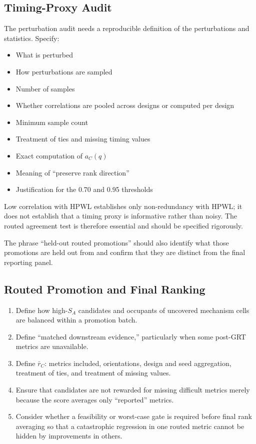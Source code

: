 \documentclass[11pt]{article}
\begin{document}
\subsection{Timing-Proxy Audit}

The perturbation audit needs a reproducible definition of the perturbations
and statistics. Specify:

\begin{itemize}
  \item What is perturbed
  \item How perturbations are sampled
  \item Number of samples
  \item Whether correlations are pooled across designs or computed per design
  \item Minimum sample count
  \item Treatment of ties and missing timing values
  \item Exact computation of $a_C(q)$
  \item Meaning of ``preserve rank direction''
  \item Justification for the 0.70 and 0.95 thresholds
\end{itemize}

Low correlation with HPWL establishes only non-redundancy with HPWL; it does
not establish that a timing proxy is informative rather than noisy. The routed
agreement test is therefore essential and should be specified rigorously.

The phrase ``held-out routed promotions'' should also identify what those
promotions are held out from and confirm that they are distinct from the final
reporting panel.

\subsection{Routed Promotion and Final Ranking}

\begin{enumerate}
  \item Define how high-$S_A$ candidates and occupants of uncovered mechanism
  cells are balanced within a promotion batch.

  \item Define ``matched downstream evidence,'' particularly when some
  post-GRT metrics are unavailable.

  \item Define $\bar r_C$: metrics included, orientations, design and seed
  aggregation, treatment of ties, and treatment of missing values.

  \item Ensure that candidates are not rewarded for missing difficult metrics
  merely because the score averages only ``reported'' metrics.

  \item Consider whether a feasibility or worst-case gate is required before
  final rank averaging so that a catastrophic regression in one routed metric
  cannot be hidden by improvements in others.
\end{enumerate}
\end{document}
